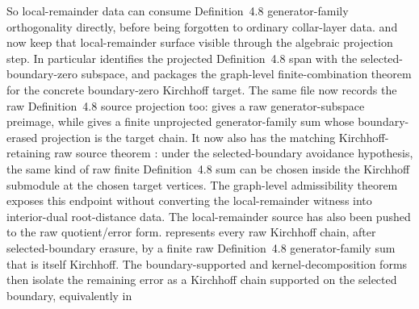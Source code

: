 \documentclass[11pt]{article}
\begin{document}
\begin{itemize}
So local-remainder data can consume Definition~4.8 generator-family
orthogonality directly, before being forgotten to ordinary collar-layer data.
 and 
now keep that local-remainder surface visible through the algebraic projection
step.  In particular
identifies the projected Definition~4.8 span with the selected-boundary-zero
subspace, and
packages the graph-level finite-combination theorem for the concrete
boundary-zero Kirchhoff target.
The same file now records the raw Definition~4.8 source projection too:
gives a raw generator-subspace preimage, while
gives a finite unprojected generator-family sum whose boundary-erased projection
is the target chain.
It now also has the matching Kirchhoff-retaining raw source theorem
:
under the selected-boundary avoidance hypothesis, the same kind of raw finite
Definition~4.8 sum can be chosen inside the Kirchhoff submodule at the chosen
target vertices.  The graph-level admissibility theorem exposes this endpoint
without converting the local-remainder witness into interior-dual root-distance
data.
The local-remainder source has also been pushed to the raw quotient/error form.
represents every raw Kirchhoff chain, after selected-boundary erasure, by a
finite raw Definition~4.8 generator-family sum that is itself Kirchhoff.  The
boundary-supported and kernel-decomposition forms then isolate the remaining
error as a Kirchhoff chain supported on the selected boundary, equivalently in

\end{itemize}
\end{document}
